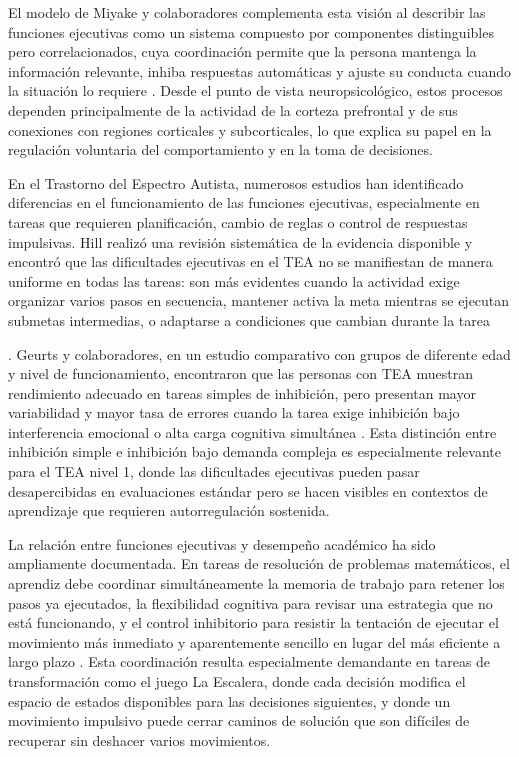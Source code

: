 \documentclass{book}
\begin{document}
El modelo de Miyake y colaboradores complementa esta 
visión al describir las funciones ejecutivas como un 
sistema compuesto por componentes distinguibles pero 
correlacionados, cuya coordinación permite que la persona 
mantenga la información relevante, inhiba respuestas 
automáticas y ajuste su conducta cuando la situación lo 
requiere \cite{Miyake2000}. Desde el punto de vista 
neuropsicológico, estos procesos dependen principalmente 
de la actividad de la corteza prefrontal y de sus 
conexiones con regiones corticales y subcorticales, lo 
que explica su papel en la regulación voluntaria del 
comportamiento y en la toma de decisiones.

En el Trastorno del Espectro Autista, numerosos estudios han identificado diferencias en el funcionamiento de las funciones ejecutivas, especialmente en tareas que requieren planificación, cambio de reglas o control de respuestas 
impulsivas. Hill realizó una revisión sistemática de la evidencia disponible y encontró que las dificultades ejecutivas en el TEA no se manifiestan de manera uniforme en todas las tareas: son más evidentes cuando la actividad 
exige organizar varios pasos en secuencia, mantener activa la meta mientras se ejecutan submetas intermedias, o adaptarse a condiciones que cambian durante la tarea 

\cite{Hill2004}. Geurts y colaboradores, en un estudio 
comparativo con grupos de diferente edad y nivel de 
funcionamiento, encontraron que las personas con TEA 
muestran rendimiento adecuado en tareas simples de 
inhibición, pero presentan mayor variabilidad y mayor 
tasa de errores cuando la tarea exige inhibición bajo 
interferencia emocional o alta carga cognitiva simultánea 
\cite{Geurts2009}. Esta distinción entre inhibición 
simple e inhibición bajo demanda compleja es especialmente 
relevante para el TEA nivel 1, donde las dificultades 
ejecutivas pueden pasar desapercibidas en evaluaciones 
estándar pero se hacen visibles en contextos de aprendizaje 
que requieren autorregulación sostenida.

La relación entre funciones ejecutivas y desempeño 
académico ha sido ampliamente documentada. En tareas de 
resolución de problemas matemáticos, el aprendiz debe 
coordinar simultáneamente la memoria de trabajo para 
retener los pasos ya ejecutados, la flexibilidad cognitiva 
para revisar una estrategia que no está funcionando, y 
el control inhibitorio para resistir la tentación de 
ejecutar el movimiento más inmediato y aparentemente 
sencillo en lugar del más eficiente a largo plazo 
\cite{Diamond2013, Baddeley2000}. Esta coordinación 
resulta especialmente demandante en tareas de 
transformación como el juego La Escalera, donde cada 
decisión modifica el espacio de estados disponibles para 
las decisiones siguientes, y donde un movimiento impulsivo 
puede cerrar caminos de solución que son difíciles de 
recuperar sin deshacer varios movimientos.
\end{document}
